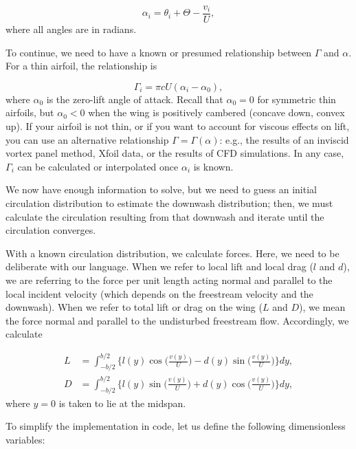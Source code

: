 \documentclass[11pt,letter]{ejlnotes}
\begin{document}
{		\begin{equation}
			\alpha_i = \theta_i + \Theta - \frac{v_i}{U}, \label{eq:alpha}
		\end{equation}
		where all angles are in radians.  
		
		To continue, we need to have a known or presumed relationship between $\Gamma$ and $\alpha$.  For a thin airfoil, the relationship is
		
		\begin{equation}
			\Gamma_i = \pi c U (\alpha_i - \alpha_0), \label{eq:Gamma}
		\end{equation}
		where $\alpha_0$ is the zero-lift angle of attack.  Recall that $\alpha_0 = 0$ for symmetric thin airfoils, but $\alpha_0 < 0$ when the wing is positively cambered (concave down, convex up).  If your airfoil is not thin, or if you want to account for viscous effects on lift, you can use an alternative relationship $\Gamma = \Gamma(\alpha)$: e.g., the results of an inviscid vortex panel method, Xfoil data, or the results of CFD simulations.  In any case, $\Gamma_i$ can be calculated or interpolated once $\alpha_i$ is known. 
		
		We now have enough information to solve, but we need to guess an initial circulation distribution to estimate the downwash distribution; then, we must calculate the circulation resulting from that downwash and iterate until the circulation converges.
		
		With a known circulation distribution, we calculate forces.  Here, we need to be deliberate with our language.  When we refer to local lift and local drag ($l$ and $d$), we are referring to the force per unit length acting normal and parallel to the local incident velocity (which depends on the freestream velocity and the downwash).  When we refer to total lift or drag on the wing ($L$ and $D$), we mean the force normal and parallel to the undisturbed freestream flow. Accordingly, we calculate 
		
		\begin{align}
			L &= \int_{-b/2}^{b/2} \bigg\{l(y) \cos\bigg(\frac{v(y)}{U}\bigg) - d(y) \sin\bigg(\frac{v(y)}{U}\bigg) \bigg\} dy, \\
			D &= \int_{-b/2}^{b/2} \bigg\{l(y) \sin\bigg(\frac{v(y)}{U}\bigg) + d(y) \cos\bigg(\frac{v(y)}{U}\bigg) \bigg\} dy, 
		\end{align}
		where $y=0$ is taken to lie at the midspan.  	
				
		To simplify the implementation in code, let us define the following dimensionless variables:
		
}
\end{document}
